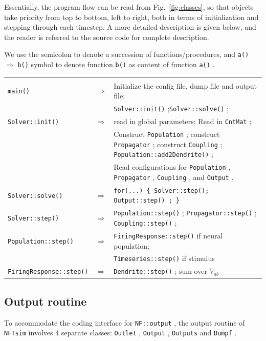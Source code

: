 \documentclass[12pt,a4paper]{article}
\newcommand{\type}[1]{{\small\small\tt #1} }
\newcommand{\NF}[0]{\type{NFTsim}}
\begin{document}
Essentially, the program flow can be read from Fig.~\ref{fig:classes}, so that objects take priority from top to bottom, left to right, both in terms of initialization and stepping through each timestep. A more detailed description is given below, and the reader is referred to the source code for complete description.

We use the semicolon to denote a succession of functions/procedures, and \type{a()} $\Rightarrow$ \type{b()} symbol to denote function \type{b()} as content of function \type{a()}.

\begin{center}
\begin{tabular}{ | l l p{11cm} | }
\hline \\

\type{main()}& $\Rightarrow$ &Initialize the config file, dump file and output file;\\[6pt]
&&\type{Solver::init()};\type{Solver::solve()};\\[6pt]
\type{Solver::init()}& $\Rightarrow$ &read in global parameters; Read in \type{CntMat};\\[6pt]
&&Construct \type{Population}; construct \type{Propagator}; construct \type{Coupling}; \type{Population::add2Dendrite()};\\[6pt]
&&Read configurations for \type{Population}, \type{Propagator}, \type{Coupling}, and \type{Output}.\\[6pt]
\type{Solver::solve()}& $\Rightarrow$ & \type{for(...) \{ Solver::step(); \type{Output::step()}; \} }\\[6pt]
\type{Solver::step()}& $\Rightarrow$ & \type{Population::step()}; \type{Propagator::step()}; \type{Coupling::step()};\\[6pt]
\type{Population::step()}& $\Rightarrow$ & \type{FiringResponse::step()} if neural population;\\[6pt]
&&\type{Timeseries::step()} if stimulus\\[6pt]
\type{FiringResponse::step()}& $\Rightarrow$ & \type{Dendrite::step()}; sum over \(V_{ab}\)

\\\hline
\end{tabular}
\end{center}

\subsection{Output routine}

To accommodate the coding interface for \type{NF::output}, the output routine of \NF involves 4 separate classes: \type{Outlet}, \type{Output}, \type{Outputs} and \type{Dumpf}.
\end{document}
